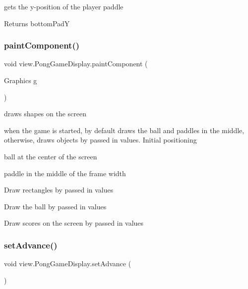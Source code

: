 gets the y-\/position of the player paddle 

\begin{DoxyReturn}{Returns}
bottom\+PadY 
\end{DoxyReturn}
\hypertarget{classview_1_1_pong_game_display_a0e3a18dfc9bbd76c97439a618a3330ac}{}\label{classview_1_1_pong_game_display_a0e3a18dfc9bbd76c97439a618a3330ac} 
\subsubsection{\texorpdfstring{paint\+Component()}{paintComponent()}}
{\footnotesize\ttfamily void view.\+Pong\+Game\+Display.\+paint\+Component (\begin{DoxyParamCaption}\item[{Graphics}]{g }\end{DoxyParamCaption})\hspace{0.3cm}{\ttfamily [protected]}}



draws shapes on the screen 

when the game is started, by default draws the ball and paddles in the middle, otherwise, draws objects by passed in values. Initial positioning
\begin{DoxyItemize}
\item ball at the center of the screen
\item paddle in the middle of the frame width
\end{DoxyItemize}

Draw rectangles by passed in values

Draw the ball by passed in values

Draw scores on the screen by passed in values\hypertarget{classview_1_1_pong_game_display_a0fedbf41897932915b12f67542cb7695}{}\label{classview_1_1_pong_game_display_a0fedbf41897932915b12f67542cb7695} 
\subsubsection{\texorpdfstring{set\+Advance()}{setAdvance()}}
{\footnotesize\ttfamily void view.\+Pong\+Game\+Display.\+set\+Advance (\begin{DoxyParamCaption}{ }\end{DoxyParamCaption})}



